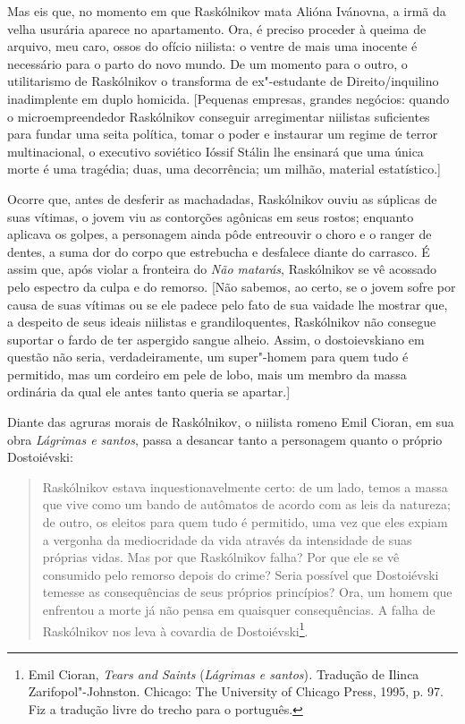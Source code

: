 Mas eis que, no momento em que Raskólnikov mata Alióna Ivánovna, a irmã
da velha usurária aparece no apartamento. Ora, é preciso proceder à
queima de arquivo, meu caro, ossos do ofício niilista: o ventre de mais
uma inocente é necessário para o parto do novo mundo. De um momento para
o outro, o utilitarismo de Raskólnikov o transforma de ex"-estudante de
Direito/inquilino inadimplente em duplo homicida. {[}Pequenas empresas,
grandes negócios: quando o microempreendedor Raskólnikov conseguir
arregimentar niilistas suficientes para fundar uma seita política, tomar
o poder e instaurar um regime de terror multinacional, o executivo
soviético Ióssif Stálin lhe ensinará que uma única morte é uma tragédia;
duas, uma decorrência; um milhão, material estatístico.{]}

Ocorre que, antes de desferir as machadadas, Raskólnikov ouviu as
súplicas de suas vítimas, o jovem viu as contorções agônicas em seus
rostos; enquanto aplicava os golpes, a personagem ainda pôde entreouvir
o choro e o ranger de dentes, a suma dor do corpo que estrebucha e
desfalece diante do carrasco. É assim que, após violar a fronteira do
\emph{Não matarás}, Raskólnikov se vê acossado pelo espectro da culpa e
do remorso. {[}Não sabemos, ao certo, se o jovem sofre por causa de suas
vítimas ou se ele padece pelo fato de sua vaidade lhe mostrar que, a
despeito de seus ideais niilistas e grandiloquentes, Raskólnikov não
consegue suportar o fardo de ter aspergido sangue alheio. Assim, o
dostoievskiano em questão não seria, verdadeiramente, um super"-homem
para quem tudo é permitido, mas um cordeiro em pele de lobo, mais um
membro da massa ordinária da qual ele antes tanto queria se apartar.{]}

Diante das agruras morais de Raskólnikov, o niilista romeno Emil Cioran,
em sua obra \emph{Lágrimas e santos}, passa a desancar tanto a
personagem quanto o próprio Dostoiévski:

\begin{quote}
Raskólnikov estava inquestionavelmente certo: de um lado, temos a massa
que vive como um bando de autômatos de acordo com as leis da natureza;
de outro, os eleitos para quem tudo é permitido, uma vez que eles expiam
a vergonha da mediocridade da vida através da intensidade de suas
próprias vidas. Mas por que Raskólnikov falha? Por que ele se vê
consumido pelo remorso depois do crime? Seria possível que Dostoiévski
temesse as consequências de seus próprios princípios? Ora, um homem que
enfrentou a morte já não pensa em quaisquer consequências. A falha de
Raskólnikov nos leva à covardia de Dostoiévski\footnote{Emil Cioran,
  \emph{Tears and Saints} (\emph{Lágrimas e santos})\emph{.} Tradução de
  Ilinca Zarifopol"-Johnston. Chicago: The University of Chicago Press,
  1995, p. 97. Fiz a tradução livre do trecho para o português.}.
\end{quote}

